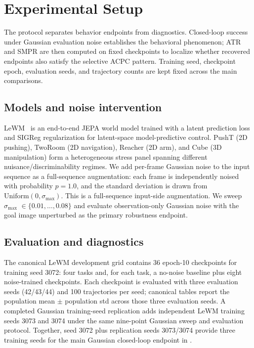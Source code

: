 \documentclass[10pt]{article}
\newcommand{\stdmax}{\ensuremath{\sigma_{\max}}}
\begin{document}
\section{Experimental Setup}\label{sec:bg}

The protocol separates behavior endpoints from diagnostics. Closed-loop success under Gaussian evaluation noise establishes the behavioral phenomenon; ATR and SMPR are then computed on fixed checkpoints to localize whether recovered endpoints also satisfy the selective ACPC pattern. Training seed, checkpoint epoch, evaluation seeds, and trajectory counts are kept fixed across the main comparisons.

\subsection{Models and noise intervention}\label{sec:bg-models}

LeWM~\cite{maes2026lewm} is an end-to-end JEPA world model trained with a latent prediction loss and SIGReg regularization for latent-space model-predictive control. PushT (2D pushing), TwoRoom (2D navigation), Reacher (2D arm), and Cube (3D manipulation) form a heterogeneous stress panel spanning different nuisance/discriminability regimes. We add per-frame Gaussian noise to the input sequence as a full-sequence augmentation: each frame is independently noised with probability $p=1.0$, and the standard deviation is drawn from $\mathrm{Uniform}(0,\stdmax{})$. This is a full-sequence input-side augmentation. We sweep \stdmax{} $\in \{0.01,\dots,0.08\}$ and evaluate observation-only Gaussian noise with the goal image unperturbed as the primary robustness endpoint.

\subsection{Evaluation and diagnostics}\label{sec:bg-protocol}

The canonical LeWM development grid contains 36 epoch-10 checkpoints for training seed 3072: four tasks and, for each task, a no-noise baseline plus eight noise-trained checkpoints. Each checkpoint is evaluated with three evaluation seeds (42/43/44) and 100 trajectories per seed; canonical tables report the population mean $\pm$ population std across those three evaluation seeds. A completed Gaussian training-seed replication adds independent LeWM training seeds 3073 and 3074 under the same nine-point Gaussian sweep and evaluation protocol. Together, seed 3072 plus replication seeds 3073/3074 provide three training seeds for the main Gaussian closed-loop endpoint in .
\end{document}
